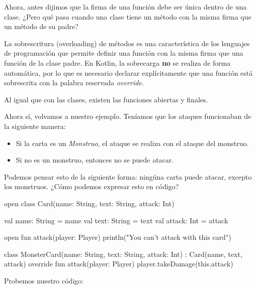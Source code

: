   Ahora, antes dijimos que la firma de una función debe ser única dentro de una clase.
  ¿Pero qué pasa cuando una clase tiene un método con la misma firma que un método de su padre?

  \begin{defaultbox}
    La sobrescritura (overloading) de métodos es una característica de los lenguajes de programación 
    que permite definir una función con la misma firma que una función de la clase padre.
    En Kotlin, la sobrecarga \textbf{no} se realiza de forma automática, por lo que es necesario
    declarar explícitamente que una función está sobrescrita con la palabra reservada
    \textit{override}.
  \end{defaultbox}

  \begin{note}
    Al igual que con las clases, existen las funciones abiertas y finales.
  \end{note}

  Ahora sí, volvamos a nuestro ejemplo.
  Teníamos que los ataques funcionaban de la siguiente manera:

  \begin{itemize}
    \item Si la carta es un \textit{Monstruo}, el ataque se realiza con el ataque del monstruo.
    \item Si no es un monstruo, entonces no se puede atacar.
  \end{itemize}

  Podemos pensar esto de la siguiente forma: ningúna carta puede atacar, excepto los monstruos.
  ¿Cómo podemos expresar esto en código?

  \begin{kotlin}
    open class Card(name: String, text: String, attack: Int) {
      val name: String = name
      val text: String = text
      val attack: Int = attack

      open fun attack(player: Player) {
        println("You can't attack with this card")
      }
    }
  \end{kotlin}

  \begin{kotlin}
    class MonsterCard(name: String, text: String, attack: Int) : Card(name, text, attack) {
      override fun attack(player: Player) {
        player.takeDamage(this.attack)
      }
    }
  \end{kotlin}

  Probemos nuestro código:

